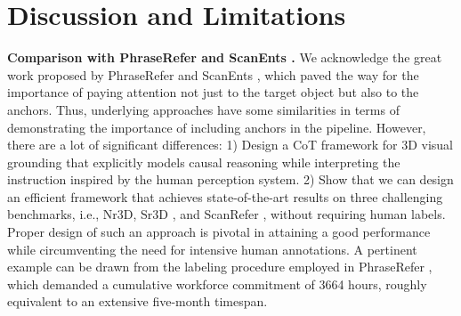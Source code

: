 \section{Discussion and Limitations}

\noindent \textbf{Comparison with PhraseRefer \citep{yuan2022toward} and ScanEnts \citep{abdelreheem2022scanents3d}.}
We acknowledge the great work proposed by PhraseRefer \citep{yuan2022toward} and ScanEnts \citep{abdelreheem2022scanents3d}, which paved the way for the importance of paying attention not just to the target object but also to the anchors.
Thus, underlying approaches have some similarities in terms of demonstrating the importance of including anchors in the pipeline.
However, there are a lot of significant differences:
1) Design a CoT framework for 3D visual grounding that explicitly models causal reasoning while interpreting the instruction inspired by the human perception system.
2) Show that we can design an efficient framework that achieves state-of-the-art results on three challenging benchmarks, i.e., Nr3D, Sr3D \citep{achlioptas2020referit3d}, and ScanRefer \citep{chen2020scanrefer}, without requiring human labels. Proper design of such an approach is pivotal in attaining a good performance  while circumventing the need for intensive human annotations.
A pertinent example can be drawn from the labeling procedure employed in PhraseRefer \citep{yuan2022toward}, which demanded a cumulative workforce commitment of 3664 hours, roughly equivalent to an extensive five-month timespan.
